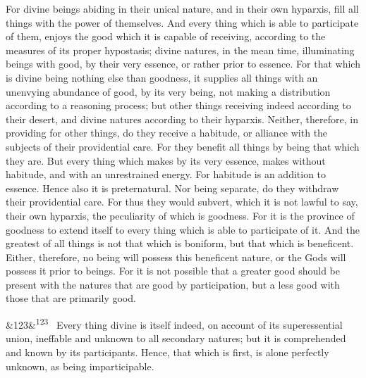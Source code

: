 \documentclass[12pt]{article}
\newcommand{\para}[1][]{\par\noindent\ifx&#1&\else\textsuperscript{\footnotesize #1}~\fi}
\begin{document}
For divine beings abiding in their unical nature, and in their own hyparxis, fill all things with the power of themselves. And every thing which is able to participate of them, enjoys the good which it is capable of receiving, according to the measures of its proper hypostasis; divine natures, in the mean time, illuminating beings with good, by their very essence, or rather prior to essence. For that which is divine being nothing else than goodness, it supplies all things with an unenvying abundance of good, by its very being, not making a distribution according to a reasoning process; but other things receiving indeed according to their desert, and divine natures according to their hyparxis. Neither, therefore, in providing for other things, do they receive a habitude, or alliance with the subjects of their providential care. For they benefit all things by being that which they are. But every thing which makes by its very essence, makes without habitude, and with an unrestrained energy. For habitude is an addition to essence. Hence also it is preternatural. Nor being separate, do they withdraw their providential care. For thus they would subvert, which it is not lawful to say, their own hyparxis, the peculiarity of which is goodness. For it is the province of goodness to extend itself to every thing which is able to participate of it. And the greatest of all things is not that which is boniform, but that which is beneficent. Either, therefore, no being will possess this beneficent nature, or the Gods will possess it prior to beings. For it is not possible that a greater good should be present with the natures that are good by participation, but a less good with those that are primarily good.

\para[123] Every thing divine is itself indeed, on account of its superessential union, ineffable and unknown to all secondary natures; but it is comprehended and known by its participants. Hence, that which is first, is alone perfectly unknown, as being imparticipable.
\end{document}
